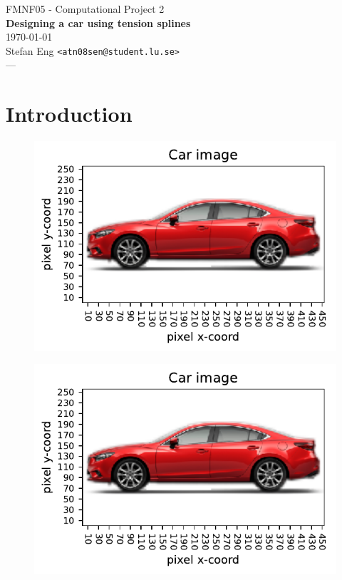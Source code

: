 \documentclass{article}
\begin{document}
\begin{center}
  {\small FMNF05 - Computational Project 2} \\
  {\Large\textbf{Designing a car using tension splines}} \\
  \vspace{0.4cm}
  \today\\
  \vspace{0.2cm}
  Stefan Eng \texttt{<atn08sen@student.lu.se>} \\
  \vspace{0.4cm}
  {\Large ---}
\end{center}

\section*{Introduction}

\begin{figure}[!ht]
  \center
  \includegraphics{figs/p2-car.pdf}
\end{figure}

\begin{figure}[!ht]
  \center
  \includegraphics{figs/p2-car-grid.pdf}
\end{figure}
\end{document}
